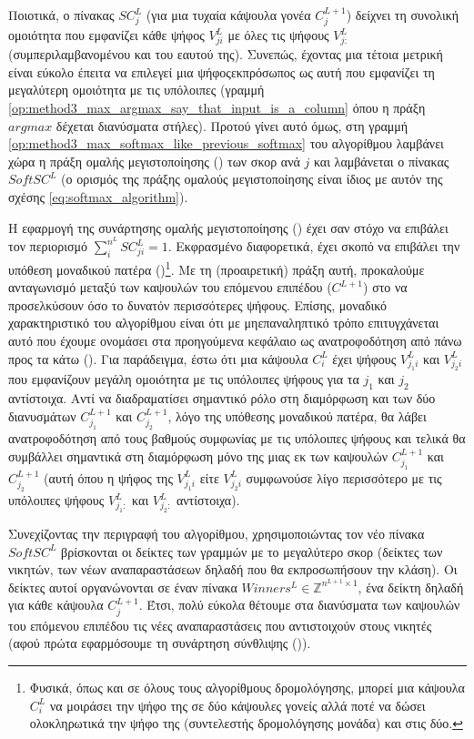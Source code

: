 Ποιοτικά, ο πίνακας $SC^L_j$ (για μια τυχαία κάψουλα γονέα $C_j^{L+1}$) δείχνει τη συνολική ομοιότητα που εμφανίζει κάθε ψήφος $V_{ji}^L$ με όλες τις ψήφους $V_{j:}^L$ (συμπεριλαμβανομένου και του εαυτού της). Συνεπώς, έχοντας μια τέτοια μετρική είναι εύκολο έπειτα να επιλεγεί μια ψήφος\textendash εκπρόσωπος ως αυτή που εμφανίζει τη μεγαλύτερη ομοιότητα με τις υπόλοιπες (γραμμή \ref{op:method3_max_argmax_say_that_input_is_a_column} όπου η πράξη $argmax$ δέχεται διανύσματα στήλες). Προτού γίνει αυτό όμως, στη γραμμή \ref{op:method3_max_softmax_like_previous_softmax} του αλγορίθμου λαμβάνει χώρα η πράξη ομαλής μεγιστοποίησης () των σκορ ανά $j$ και λαμβάνεται ο πίνακας $SoftSC^L$ (ο ορισμός της πράξης ομαλούς μεγιστοποίησης είναι ίδιος με αυτόν της σχέσης \ref{eq:softmax_algorithm}).\par

Η εφαρμογή της συνάρτησης ομαλής μεγιστοποίησης () έχει σαν στόχο να επιβάλει τον περιορισμό $\sum_i^{n^L} SC_{ji}^L = 1$. Εκφρασμένο διαφορετικά, έχει σκοπό να επιβάλει την υπόθεση μοναδικού πατέρα ()\footnote{Φυσικά, όπως και σε όλους τους αλγορίθμους δρομολόγησης, μπορεί μια κάψουλα $C_i^L$ να μοιράσει την ψήφο της σε δύο κάψουλες γονείς αλλά ποτέ να δώσει ολοκληρωτικά την ψήφο της (συντελεστής δρομολόγησης μονάδα) και στις δύο.}. Με τη (προαιρετική) πράξη αυτή, προκαλούμε ανταγωνισμό μεταξύ των καψουλών του επόμενου επιπέδου ($C^{L+1}$) στο να προσελκύσουν όσο το δυνατόν περισσότερες ψήφους. Επίσης, μοναδικό χαρακτηριστικό του αλγορίθμου είναι ότι με μη\textendash επαναληπτικό τρόπο επιτυγχάνεται αυτό που έχουμε ονομάσει στα προηγούμενα κεφάλαιο ως ανατροφοδότηση από πάνω προς τα κάτω (). Για παράδειγμα, έστω ότι μια κάψουλα $C_i^L$ έχει ψήφους $V_{j_1i}^L$ και $V_{j_2i}^L$ που εμφανίζουν μεγάλη ομοιότητα με τις υπόλοιπες ψήφους για τα $j_1$ και $j_2$ αντίστοιχα. Αντί να διαδραματίσει σημαντικό ρόλο στη διαμόρφωση και των δύο διανυσμάτων $C_{j_1}^{L+1}$ και $C_{j_2}^{L+1}$, λόγο της υπόθεσης μοναδικού πατέρα, θα λάβει ανατροφοδότηση από τους βαθμούς συμφωνίας με τις υπόλοιπες ψήφους και τελικά θα συμβάλλει σημαντικά στη διαμόρφωση μόνο της μιας εκ των καψουλών $C_{j_1}^{L+1}$ και $C_{j_2}^{L+1}$ (αυτή όπου η ψήφος της $V_{j_1i}^L$ είτε $V_{j_2i}^L$ συμφωνούσε λίγο περισσότερο με τις υπόλοιπες ψήφους $V_{j_1:}^L$ και $V_{j_2:}^L$ αντίστοιχα).\par

Συνεχίζοντας την περιγραφή του αλγορίθμου, χρησιμοποιώντας τον νέο πίνακα $ SoftSC^L $ βρίσκονται οι δείκτες των γραμμών με το μεγαλύτερο σκορ (δείκτες των νικητών, των νέων αναπαραστάσεων δηλαδή που θα εκπροσωπήσουν την κλάση). Οι δείκτες αυτοί οργανώνονται σε έναν πίνακα $ Winners^L \in \mathbb{Z}^{n^{L+1}\times 1} $, ένα δείκτη δηλαδή για κάθε κάψουλα $C_j^{L+1}$. Έτσι, πολύ εύκολα θέτουμε στα διανύσματα των καψουλών του επόμενου επιπέδου τις νέες αναπαραστάσεις που αντιστοιχούν στους νικητές (αφού πρώτα εφαρμόσουμε τη συνάρτηση σύνθλιψης ()).\par

